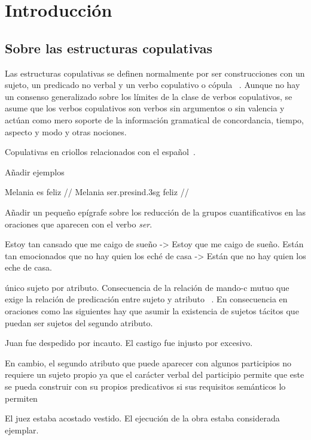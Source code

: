 \chapter{Introducción}
\vspace*{-.25in}
\section{Sobre las estructuras copulativas}
Las estructuras copulativas se definen normalmente por ser construcciones con un sujeto, un predicado no verbal y un verbo copulativo o cópula ~\autocite{Bentley20179Copular-and-}. Aunque no hay un consenso generalizado sobre los límites de la clase de verbos copulativos, se asume que los verbos copulativos son verbos sin argumentos o sin valencia y actúan como mero soporte de la información gramatical de concordancia, tiempo, aspecto y modo y otras nociones.


Copulativas en criollos relacionados con el español~\autocite{Green1997Romance-creoles}. 

Añadir ejemplos



\ex[glspace=!1em,everygla={},everyglb={},aboveglbskip=-.2ex]
\begingl
\gla Melania es feliz //
\glb Melania ser.{\sc presind}.{\sc 3sg} feliz  //
\endgl
\xe


Añadir un pequeño epígrafe sobre los reducción de la grupos cuantificativos en las oraciones que aparecen con el verbo \textit{ser}.

\pex[*]
\a	Estoy tan cansado que me caigo de sueño -> Estoy que me caigo de sueño.
\a	Están tan emocionados que no hay quien los eché de casa -> Están que no hay quien los eche de casa.
\xe


único sujeto por atributo. Consecuencia de la relación de mando-c mutuo que exige la relación de predicación entre sujeto y atributo ~\autocite{Williams1980Predication,Bowers1993The-Syntax-of-Predic}. En consecuencia en oraciones como las siguientes hay que asumir la existencia de sujetos tácitos que puedan ser sujetos del segundo atributo.

\pex[*]
\a Juan fue despedido por incauto.
\a El castigo fue injusto por excesivo.
\xe


En cambio, el segundo atributo que puede aparecer con algunos participios no requiere un sujeto propio ya que el carácter verbal del participio permite que este se pueda construir con su propios predicativos si sus requisitos semánticos lo permiten~\autocite{Bosque1999el-sintagma-adjetiva}

\pex[*]
\a	El juez estaba acostado vestido.
\a	El ejecución de la obra estaba considerada ejemplar.
\xe
